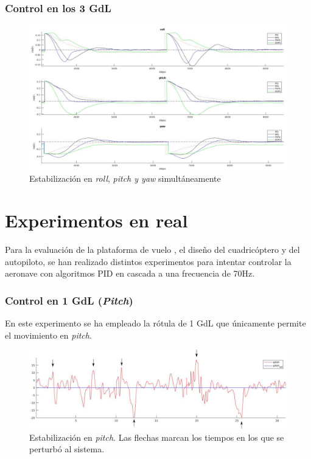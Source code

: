 \subsubsection{Control en los 3 GdL}


\begin{figure}[htb!]
	\centering
	\includegraphics[width=0.9\textheight,angle=90]{experimentos/3_angles_real}
	\vspace{0.5cm}
	\caption{Estabilización en \textit{roll}, \textit{pitch y \textit{yaw}} simultáneamente}
	\label{tl_pr}	
\end{figure}

\section{Experimentos en real}
Para la evaluación de la plataforma de vuelo , el diseño del cuadricóptero y del autopiloto, se han realizado distintos experimentos para intentar controlar la aeronave con algoritmos PID en cascada a una frecuencia de 70Hz.
\subsubsection{Control en 1 GdL (\textit{Pitch})}

En este experimento se ha empleado la rótula de 1 GdL que únicamente permite el movimiento en \textit{pitch}.

\begin{figure}[htb!]
	\centering
	\includegraphics[width=\textwidth]{experimentos/real_only_pitch}
	\caption{Estabilización en \textit{pitch}. Las flechas marcan los tiempos en los que se perturbó al sistema.}
	\label{mat_lab_graph}	
\end{figure}


